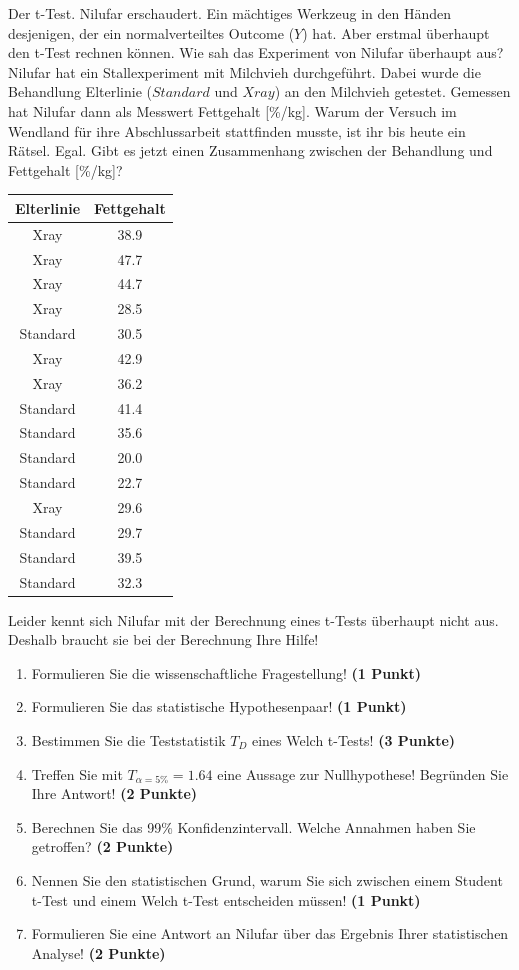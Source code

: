 \documentclass[a4paper, 9pt]{scrartcl}\usepackage[]{graphicx}\usepackage[]{xcolor}
\begin{document}
Der t-Test. Nilufar erschaudert. Ein mächtiges Werkzeug in den Händen desjenigen, der ein normalverteiltes Outcome ($Y$) hat. Aber erstmal überhaupt den t-Test rechnen können. Wie sah das Experiment von Nilufar überhaupt aus? Nilufar hat ein Stallexperiment mit Milchvieh durchgeführt. Dabei wurde die Behandlung Elterlinie ($Standard$ und $Xray$) an den Milchvieh getestet. Gemessen hat Nilufar dann als Messwert Fettgehalt [\%/kg]. Warum der Versuch im Wendland für ihre Abschlussarbeit stattfinden musste, ist ihr bis heute ein Rätsel. Egal. Gibt es jetzt einen Zusammenhang zwischen der Behandlung und Fettgehalt [\%/kg]?

\begin{table}[!h]
\centering
\begin{tabular}{cc}
\toprule
Elterlinie & Fettgehalt\\
\midrule
Xray & 38.9\\
Xray & 47.7\\
Xray & 44.7\\
Xray & 28.5\\
Standard & 30.5\\
\addlinespace
Xray & 42.9\\
Xray & 36.2\\
Standard & 41.4\\
Standard & 35.6\\
Standard & 20.0\\
\addlinespace
Standard & 22.7\\
Xray & 29.6\\
Standard & 29.7\\
Standard & 39.5\\
Standard & 32.3\\
\bottomrule
\end{tabular}
\end{table}



Leider kennt sich Nilufar mit der Berechnung eines t-Tests überhaupt nicht aus. Deshalb braucht sie bei der Berechnung Ihre Hilfe!

\begin{enumerate}
  \item Formulieren Sie die wissenschaftliche Fragestellung! \textbf{(1 Punkt)}
  \item Formulieren Sie das statistische Hypothesenpaar! \textbf{(1 Punkt)}
  \item Bestimmen Sie die Teststatistik $T_{D}$ eines  Welch t-Tests! \textbf{(3 Punkte)}
  \item Treffen Sie mit $T_{\alpha = 5\%} = 1.64$ eine Aussage zur Nullhypothese! Begründen Sie Ihre Antwort! \textbf{(2 Punkte)}
\item Berechnen Sie das 99\% Konfidenzintervall. Welche Annahmen haben Sie getroffen? \textbf{(2 Punkte)}
\item Nennen Sie den statistischen Grund, warum Sie sich zwischen einem Student t-Test und einem Welch t-Test entscheiden müssen! \textbf{(1 Punkt)}
\item Formulieren Sie eine Antwort an Nilufar über das Ergebnis Ihrer statistischen Analyse! \textbf{(2 Punkte)}
\end{enumerate} 
\clearpage
\end{document}
